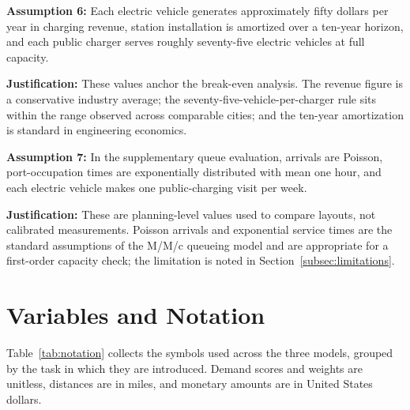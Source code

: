 \documentclass[11pt]{article}
\begin{document}
\textbf{Assumption 6:} Each electric vehicle generates approximately fifty dollars per year in charging revenue, station installation is amortized over a ten-year horizon, and each public charger serves roughly seventy-five electric vehicles at full capacity.

\textbf{Justification:} These values anchor the break-even analysis. The revenue figure is a conservative industry average; the seventy-five-vehicle-per-charger rule sits within the range observed across comparable cities; and the ten-year amortization is standard in engineering economics.

\vspace{0.5em}
\textbf{Assumption 7:} In the supplementary queue evaluation, arrivals are Poisson, port-occupation times are exponentially distributed with mean one hour, and each electric vehicle makes one public-charging visit per week.

\textbf{Justification:} These are planning-level values used to compare layouts, not calibrated measurements. Poisson arrivals and exponential service times are the standard assumptions of the M/M/c queueing model and are appropriate for a first-order capacity check; the limitation is noted in Section~\ref{subsec:limitations}.

\section{Variables and Notation}
\label{sec:notation}

Table~\ref{tab:notation} collects the symbols used across the three models, grouped by the task in which they are introduced. Demand scores and weights are unitless, distances are in miles, and monetary amounts are in United States dollars.
\end{document}
